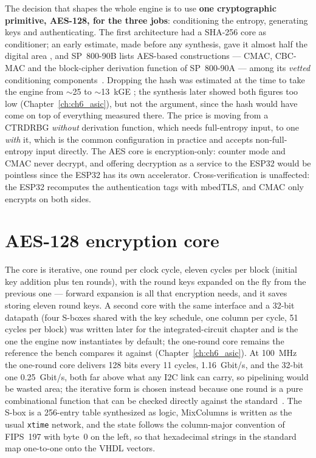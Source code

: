 The decision that shapes the whole engine is to use \textbf{one
cryptographic primitive, AES-128, for the three jobs}: conditioning the
entropy, generating keys and authenticating. The first architecture had
a SHA-256 core as conditioner; an early estimate, made before any
synthesis, gave it almost half the digital area \est{}, and SP~800-90B lists AES-based constructions --- CMAC,
CBC-MAC and the block-cipher derivation function of SP~800-90A --- among
its \emph{vetted} conditioning components~\cite{turan_2018_sp80090b}.
Dropping the hash was estimated at the time to take the engine from
$\sim$25 to $\sim$13~kGE \est{}; the synthesis later showed both figures
too low (Chapter~\ref{ch:ch6_asic}), but not the argument, since the hash
would have come on top of everything measured there. The price is moving
from a
\ac{CTRDRBG} \emph{without} derivation function, which needs full-entropy
input, to one \emph{with} it, which is the common configuration in
practice and accepts non-full-entropy input directly. The AES core is
encryption-only: counter mode and CMAC never decrypt, and offering
decryption as a service to the ESP32 would be pointless since the ESP32
has its own accelerator. Cross-verification is unaffected: the ESP32
recomputes the authentication tags with mbedTLS, and CMAC only encrypts
on both sides.

\section{AES-128 encryption core}
\label{sec:aes}

The core is iterative, one round per clock cycle, eleven cycles per block
(initial key addition plus ten rounds), with the round keys expanded on
the fly from the previous one --- forward expansion is all that
encryption needs, and it saves storing eleven round keys. A second core
with the same interface and a 32-bit datapath (four S-boxes shared with
the key schedule, one column per cycle, 51 cycles per block) was written
later for the integrated-circuit chapter and is the one the engine now
instantiates by default; the one-round core remains the reference the
bench compares it against (Chapter~\ref{ch:ch6_asic}). At 100~MHz the
one-round core delivers 128 bits every 11 cycles, 1.16~Gbit/s, and the
32-bit one 0.25~Gbit/s, both far above what any \ac{I2C} link can
carry, so pipelining would be wasted area; the iterative form is chosen
instead because one round is a pure combinational function that can be
checked directly against the standard~\cite{nist_2023_fips197}. The
S-box is a 256-entry table synthesized as logic, MixColumns is written as
the usual \texttt{xtime} network, and the state follows the column-major
convention of FIPS~197 with byte~0 on the left, so that hexadecimal
strings in the standard map one-to-one onto the VHDL vectors.

